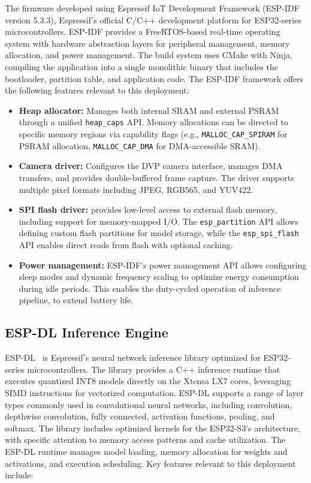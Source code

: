 The firmware developed using Espressif IoT Development Framework (ESP-IDF version 5.3.3), Espressif's official C/C++ development platform for ESP32-series microcontrollers. ESP-IDF provides a FreeRTOS-based real-time operating system with hardware abstraction layers for peripheral management, memory allocation, and power management. The build system uses CMake with Ninja, compiling the application into a single monolithic binary that includes the bootloader, partition table, and application code. The ESP-IDF framework offers the following features relevant to this deployment:
\begin{itemize}
    \item \textbf{Heap allocator:} Manages both internal SRAM and external PSRAM through a unified \texttt{heap\_caps} API. Memory allocations can be directed to specific memory regions via capability flags (e.g., \texttt{MALLOC\_CAP\_SPIRAM} for PSRAM allocation, \texttt{MALLOC\_CAP\_DMA} for DMA-accessible SRAM).
    \item \textbf{Camera driver:} Configures the DVP camera interface, manages DMA transfers, and provides double-buffered frame capture. The driver supports multiple pixel formats including JPEG, RGB565, and YUV422.
    \item \textbf{SPI flash driver:} provides low-level access to external flash memory, including support for memory-mapped I/O. The \texttt{esp\_partition} API allows defining custom flash partitions for model storage, while the \texttt{esp\_spi\_flash} API enables direct reads from flash with optional caching.
    \item \textbf{Power management:} ESP-IDF's power management API allows configuring sleep modes and dynamic frequency scaling to optimize energy consumption during idle periods. This enables the duty-cycled operation of inference pipeline, to extend battery life.
\end{itemize}

\subsection{ESP-DL Inference Engine}
\label{subsec:esp_dl}

ESP-DL~\cite{esp_dl} is Espressif's neural network inference library optimized for ESP32-series microcontrollers. The library provides a C++ inference runtime that executes quantized INT8 models directly on the Xtensa LX7 cores, leveraging SIMD instructions for vectorized computation. ESP-DL supports a range of layer types commonly used in convolutional neural networks, including convolution, depthwise convolution, fully connected, activation functions, pooling, and softmax. The library includes optimized kernels for the ESP32-S3's architecture, with specific attention to memory access patterns and cache utilization. The ESP-DL runtime manages model loading, memory allocation for weights and activations, and execution scheduling. Key features relevant to this deployment include:

